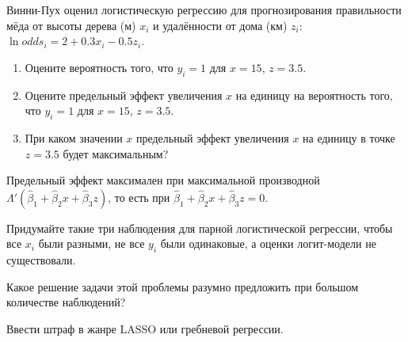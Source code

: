 \begin{problem}
Винни-Пух оценил логистическую регрессию для прогнозирования правильности мёда от высоты дерева (м) $x_i$ и удалённости от дома (км) $z_i$: $\ln odds_i = 2+0.3x_i - 0.5z_i$.
\begin{enumerate}
\item Оцените вероятность того, что $y_i=1$ для $x=15$, $z=3.5$.
\item Оцените предельный эффект увеличения $x$ на единицу на вероятность того, что $y_i=1$ для $x=15$, $z=3.5$.
\item При каком значении $x$ предельный эффект увеличения $x$ на единицу в точке $z=3.5$ будет максимальным?
\end{enumerate}

\begin{sol}
Предельный эффект максимален при максимальной производной $\Lambda'(\hat \beta_1 + \hat\beta_2x + \hat\beta_3z)$, то есть при $\hat \beta_1 + \hat\beta_2x + \hat\beta_3z=0$.
\end{sol}
\end{problem}


\begin{problem}
  Придумайте такие три наблюдения для парной логистической регрессии, чтобы все $x_i$ были разными, не все $y_i$ были одинаковые, а оценки логит-модели не существовали.

  Какое решение задачи этой проблемы разумно предложить при большом количестве наблюдений?

\begin{sol}
  Ввести штраф в жанре LASSO или гребневой регрессии.
\end{sol}
\end{problem}


